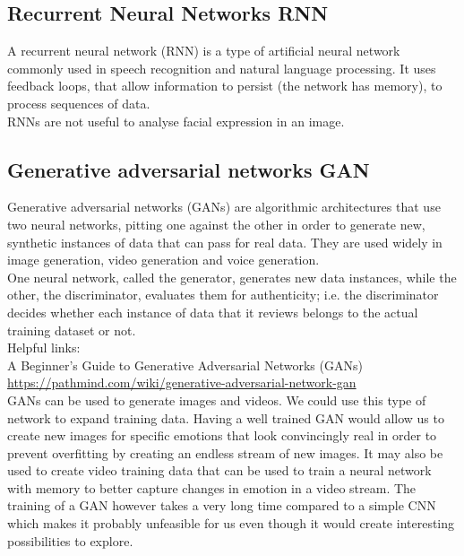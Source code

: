 \subsection{Recurrent Neural Networks RNN}

A recurrent neural network (RNN) is a type of artificial neural network commonly used in speech recognition and natural language processing. It uses feedback loops, that allow information to persist (the network has memory), to process sequences of data.\\

RNNs are not useful to analyse facial expression in an image.

\subsection{Generative adversarial networks GAN}

Generative adversarial networks (GANs) are algorithmic architectures that use two neural networks, pitting one against the other in order to generate new, synthetic instances of data that can pass for real data. They are used widely in image generation, video generation and voice generation.\\
One neural network, called the generator, generates new data instances, while the other, the discriminator, evaluates them for authenticity; i.e. the discriminator decides whether each instance of data that it reviews belongs to the actual training dataset or not.\\

Helpful links:\\
A Beginner's Guide to Generative Adversarial Networks (GANs)
\\
\url{https://pathmind.com/wiki/generative-adversarial-network-gan}
\\

GANs can be used to generate images and videos. We could use this type of network to expand training data. 
Having a well trained GAN would allow us to create new images for specific emotions that look convincingly real in order to prevent overfitting by creating an endless stream of new images. 
It may also be used to create video training data that can be used to train a neural network with memory to better capture changes in emotion in a video stream. 
The training of a GAN however takes a very long time compared to a simple CNN which makes it probably unfeasible for us even though it would create interesting possibilities to explore. 


